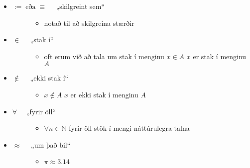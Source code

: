 \documentclass[a4paper,10pt,icelandic]{sphinxmanual}
\begin{document}
\begin{itemize}
\item {} \begin{description}
\item[{\(:= \; \text{eða} \; \equiv \quad\) „skilgreint sem“}] \leavevmode\begin{itemize}
\item {} 
notað til að skilgreina stærðir

\end{itemize}

\end{description}

\item {} \begin{description}
\item[{\(\in \quad\) „stak í“}] \leavevmode\begin{itemize}
\item {} 
oft erum við að tala um stak í menginu \(x \in A\) \(x\) er stak í menginu \(A\)

\end{itemize}

\end{description}

\item {} \begin{description}
\item[{\(\notin \quad\) „ekki stak í“}] \leavevmode\begin{itemize}
\item {} 
\(x \notin A\) \(x\) er ekki stak í menginu \(A\)

\end{itemize}

\end{description}

\item {} \begin{description}
\item[{\(\forall \quad\) „fyrir öll“}] \leavevmode\begin{itemize}
\item {} 
\(\forall n \in \mathbb{N}\) fyrir öll stök í mengi náttúrulegra talna

\end{itemize}

\end{description}

\item {} \begin{description}
\item[{\(\approx \quad\) „um það bil“}] \leavevmode\begin{itemize}
\item {} 
\(\pi \approx 3.14\)


\end{itemize}
\end{description}
\end{itemize}
\end{document}
